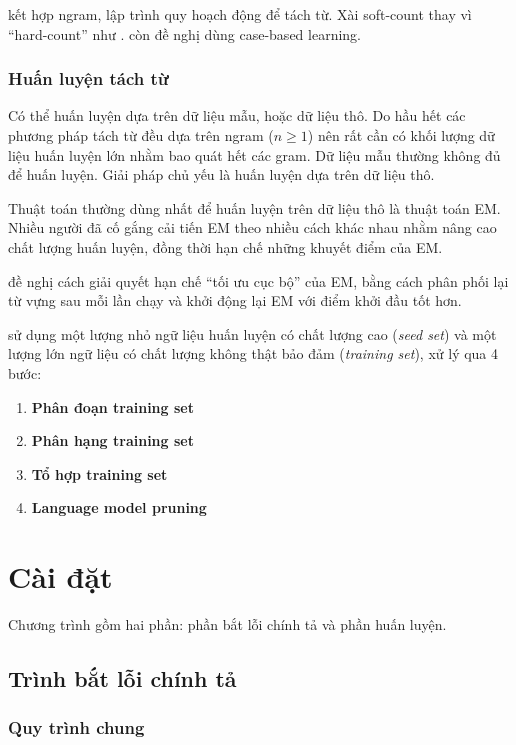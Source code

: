 \documentclass[a4paper]{book} %
\begin{document}
\cite{Chunyu} kết hợp ngram, lập trình quy hoạch động để tách từ. Xài
soft-count thay vì ``hard-count'' như \cite{Chang}. \cite{Chunyu} còn
đề nghị dùng case-based learning.

\subsection{Huấn luyện tách từ}

Có thể huấn luyện dựa trên dữ liệu mẫu, hoặc dữ liệu thô. Do hầu hết
các phương pháp tách từ đều dựa trên ngram ($n\ge 1$) nên rất cần có
khối lượng dữ liệu huấn luyện lớn nhằm bao quát hết các gram. Dữ liệu
mẫu thường không đủ để huấn luyện. Giải pháp chủ yếu là huấn luyện dựa
trên dữ liệu thô.

Thuật toán thường dùng nhất để huấn luyện trên dữ liệu thô là thuật
toán EM. Nhiều người đã cố gắng cải tiến EM theo nhiều cách khác nhau
nhằm nâng cao chất lượng huấn luyện, đồng thời hạn chế những khuyết
điểm của EM. 

\cite{self-supervised} đề nghị cách giải quyết hạn chế ``tối ưu cục
bộ'' của EM, bằng cách phân phối lại từ vựng sau mỗi lần chạy và khởi
động lại EM với điểm khởi đầu tốt hơn.

\cite{text-tiling} sử dụng một lượng nhỏ ngữ liệu huấn luyện có chất
lượng cao (\textit{seed set}) và một lượng lớn ngữ liệu có chất lượng
không thật bảo đảm (\textit{training set}), xử lý qua 4 bước:
\begin{enumerate}
\item \textbf{Phân đoạn training set}
\item \textbf{Phân hạng training set}
\item \textbf{Tổ hợp training set}
\item \textbf{Language model pruning}
\end{enumerate}

\chapter{Cài đặt}

Chương trình gồm hai phần: phần bắt lỗi chính tả và phần huấn luyện.

\section{Trình bắt lỗi chính tả}


\subsection{Quy trình chung}
\label{sec:spellcheck}
\end{document}
